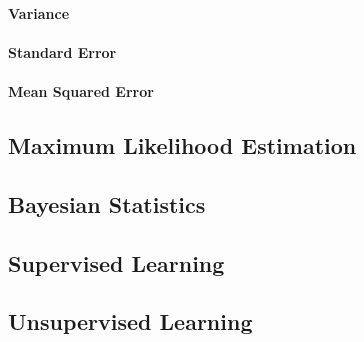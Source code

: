         \paragraph{Variance}


        \paragraph{Standard Error}

        \paragraph{Mean Squared Error}


    \subsection{Maximum Likelihood Estimation}
    \subsection{Bayesian Statistics}
    \subsection{Supervised Learning}
    \subsection{Unsupervised Learning}
